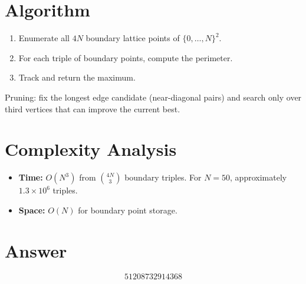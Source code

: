 \documentclass[11pt]{article}
\begin{document}
\section{Algorithm}

\begin{enumerate}
\item Enumerate all $4N$ boundary lattice points of $\{0,\ldots,N\}^2$.
\item For each triple of boundary points, compute the perimeter.
\item Track and return the maximum.
\end{enumerate}

Pruning: fix the longest edge candidate (near-diagonal pairs) and search only over third vertices that can improve the current best.

\section{Complexity Analysis}

\begin{itemize}
\item \textbf{Time:} $O(N^3)$ from $\binom{4N}{3}$ boundary triples. For $N=50$, approximately $1.3\times10^6$ triples.
\item \textbf{Space:} $O(N)$ for boundary point storage.
\end{itemize}

\section{Answer}

\[
\boxed{51208732914368}
\]
\end{document}
